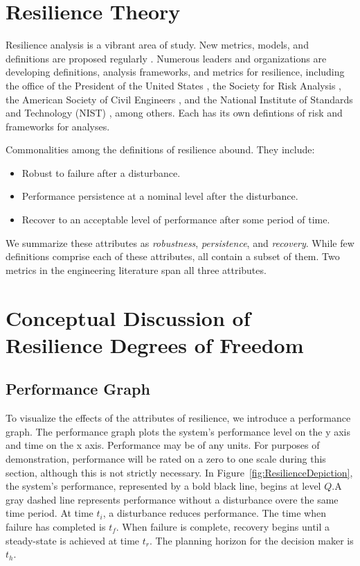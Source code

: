 \section{Resilience Theory}
Resilience analysis is a vibrant area of study. New metrics, models,
and definitions are proposed regularly \cite{Righi2015,
  Hosseini2016}. Numerous leaders and organizations are developing
definitions, analysis frameworks, and metrics for resilience,
including the office of the President of the United States
\cite{PPD21}, the Society for Risk Analysis \cite{Aven2015b}, the
American Society of Civil Engineers \cite{IRD2016}, and the National
Institute of Standards and Technology (NIST) \cite{CRP2016}, among
others. Each has its own defintions of risk and frameworks for
analyses.

Commonalities among the definitions of resilience abound. They
include:
\begin{itemize}
  \item Robust to failure after a disturbance.
  \item Performance persistence at a nominal level after the
    disturbance.
  \item Recover to an acceptable level of performance after some
    period of time.
\end{itemize}
We summarize these attributes as \emph{robustness},
\emph{persistence}, and \emph{recovery}. While few definitions
comprise each of these attributes, all contain a subset of them. Two
metrics \cite{Ayyub2014a, Ayyub2015, Ouyang2012, Ouyang2015, Aven2015b} in the
engineering literature span all three attributes.

\section{Conceptual Discussion of Resilience Degrees of Freedom}
\subsection{Performance Graph}
To visualize the effects of the attributes of resilience, we introduce
a performance graph. The performance graph plots the system's
performance level on the y axis and time on the x axis. Performance
may be of any units. For purposes of demonstration, performance will
be rated on a zero to one scale during this section, although this is
not strictly necessary. In Figure~\ref{fig:ResilienceDepiction}, the
system's performance, represented by a bold black line, begins at
level $Q$.A gray dashed line represents performance without a
disturbance overe the same time period. At time $t_i$, a disturbance
reduces performance. The time when failure has completed is
$t_f$. When failure is complete, recovery begins until a steady-state
is achieved at time $t_r$. The planning horizon for the decision maker
is $t_h$.

